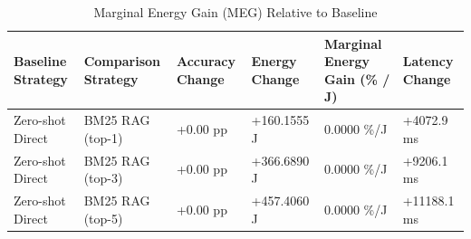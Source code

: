 \begin{table}
\caption{Marginal Energy Gain (MEG) Relative to Baseline}
\label{tab:marginal_energy_gain}
\begin{tabular}{llllll}
\toprule
Baseline Strategy & Comparison Strategy & Accuracy Change & Energy Change & Marginal Energy Gain (\% / J) & Latency Change \\
\midrule
Zero-shot Direct & BM25 RAG (top-1) & +0.00 pp & +160.1555 J & 0.0000 \%/J & +4072.9 ms \\
Zero-shot Direct & BM25 RAG (top-3) & +0.00 pp & +366.6890 J & 0.0000 \%/J & +9206.1 ms \\
Zero-shot Direct & BM25 RAG (top-5) & +0.00 pp & +457.4060 J & 0.0000 \%/J & +11188.1 ms \\
\bottomrule
\end{tabular}
\end{table}
